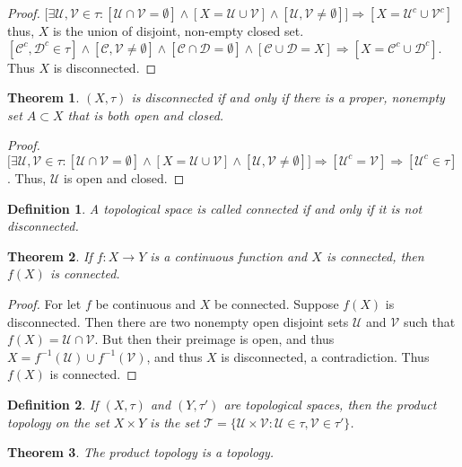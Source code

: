 \documentclass[crop=false,class=book]{standalone}
\theoremstyle{mystyle}
\newtheorem{theorem}{Theorem}[section]
\newtheorem{definition}{Definition}[section]
\begin{document}
\begin{proof}
$\big[\exists \mathcal{U},\mathcal{V}\in \tau: [\mathcal{U}\cap \mathcal{V}=\emptyset]\land [X=\mathcal{U}\cup \mathcal{V}]\land [\mathcal{U},\mathcal{V}\ne \emptyset]\big]\Rightarrow [X = \mathcal{U}^c\cup \mathcal{V}^c]$ thus, $X$ is the union of disjoint, non-empty closed set. $[\mathcal{C}^c,\mathcal{D}^c\in \tau]\land[\mathcal{C},\mathcal{V}\ne\emptyset]\land[\mathcal{C}\cap \mathcal{D}=\emptyset]\land[\mathcal{C}\cup\mathcal{D}=X]\Rightarrow [X=\mathcal{C}^c\cup\mathcal{D}^c].$ Thus $X$ is disconnected.
\end{proof}
\begin{theorem}
$(X,\tau)$ is disconnected if and only if there is a proper, nonempty set $A\subset X$ that is both open and closed.
\end{theorem}
\begin{proof}
$\big[\exists \mathcal{U},\mathcal{V}\in \tau:[\mathcal{U}\cap \mathcal{V}=\emptyset]\land [X=\mathcal{U}\cup\mathcal{V}]\land[\mathcal{U},\mathcal{V}\ne \emptyset]\big]\Rightarrow [\mathcal{U}^c = \mathcal{V}]\Rightarrow [\mathcal{U}^c\in \tau]$. Thus, $\mathcal{U}$ is open and closed.
\end{proof}
\begin{definition}
A topological space is called connected if and only if it is not disconnected.
\end{definition}
\begin{theorem}
If $f:X\rightarrow Y$ is a continuous function and $X$ is connected, then $f(X)$ is connected.
\end{theorem}
\begin{proof}
For let $f$ be continuous and $X$ be connected. Suppose $f(X)$ is disconnected. Then there are two nonempty open disjoint sets $\mathcal{U}$ and $\mathcal{V}$ such that $f(X) = \mathcal{U}\cap \mathcal{V}$. But then their preimage is open, and thus $X=f^{-1}(\mathcal{U})\cup f^{-1}(\mathcal{V})$, and thus $X$ is disconnected, a contradiction. Thus $f(X)$ is connected.
\end{proof}
\begin{definition}
If $(X,\tau)$ and $(Y,\tau')$ are topological spaces, then the product topology on the set $X\times Y$ is the set $\mathscr{T} = \{\mathcal{U}\times \mathcal{V}:\mathcal{U}\in\tau,\mathcal{V}\in \tau'\}$.
\end{definition}
\begin{theorem}
The product topology is a topology.
\end{theorem}
\end{document}
